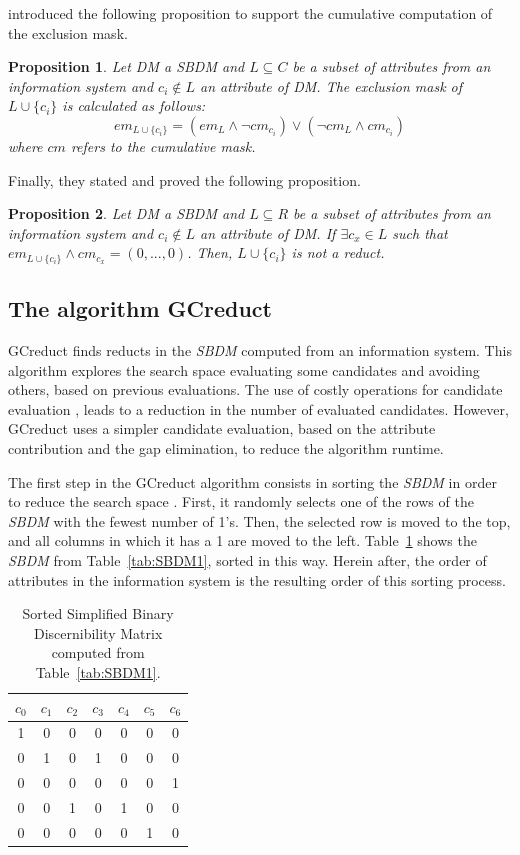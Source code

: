 \documentclass[authoryear,preprint,review,12pt]{elsarticle}
\newtheorem{proposition}{Proposition}
\begin{document}
	\cite{Lias13} introduced the following proposition to support the cumulative computation of the exclusion mask.
	
	\begin{proposition}\label{prop:cumul} 
		Let DM a SBDM and $L \subseteq C$ be a subset of attributes from an information system and $c_i \notin L$ an attribute of DM. The exclusion mask of $L \cup \lbrace c_i\rbrace$ is calculated as follows: $$em_{L \cup \lbrace c_i\rbrace}=(em_L \wedge \neg cm_{c_i}) \vee (\neg cm_L \wedge cm_{c_i})$$	where $cm$ refers to the cumulative mask.
	\end{proposition}
	
	Finally, they stated and proved the following proposition.
	
	\begin{proposition}\label{prop:exclude} 
		Let DM a SBDM and $L \subseteq R$ be a subset of attributes from an information system and $c_i \notin L$ an attribute of DM.
		If $\exists c_x \in L$ such that $em_{L \cup \lbrace c_i\rbrace} \wedge cm_{c_x}=(0,...,0)$. Then, $L \cup \lbrace c_i\rbrace$	is not a reduct.
	\end{proposition}

\subsection{The algorithm GCreduct}\label{description}
	GCreduct finds reducts in the \textit{SBDM} computed from an information system. This algorithm explores the search space evaluating some candidates and avoiding others, based on previous evaluations. The use of costly operations for candidate evaluation \citep{WangP07,Lias13}, leads to a reduction in the number of evaluated candidates. However, GCreduct uses a simpler candidate evaluation, based on the attribute contribution and the gap elimination, to reduce the algorithm runtime. 

	The first step in the GCreduct algorithm consists in sorting the \textit{SBDM} in order to reduce the search space \citep{Sanchez07}. First, it randomly selects one of the rows of the \textit{SBDM} with the fewest number of 1's. Then, the selected row is moved to the top, and all columns in which it has a 1 are moved to the left. Table~\ref{tab:SSBDM1} shows the \textit{SBDM} from Table~\ref{tab:SBDM1}, sorted in this way. Herein after, the order of attributes in the information system is the resulting order of this sorting process.
		
	\begin{table}[htb]
		\caption{Sorted Simplified Binary Discernibility Matrix computed from Table~\ref{tab:SBDM1}.}
		\centering
		\begin{tabular}{ccccccc}\label{tab:SSBDM1}
			$c_0$ & $c_1$ & $c_2$ & $c_3$ & $c_4$ & $c_5$ & $c_6$\\
			\hline
			1&0&0&0&0&0&0\\
			0&1&0&1&0&0&0\\
			0&0&0&0&0&0&1\\
			0&0&1&0&1&0&0\\
			0&0&0&0&0&1&0\\
		\end{tabular}             
	\end{table}  
	
\end{document}
